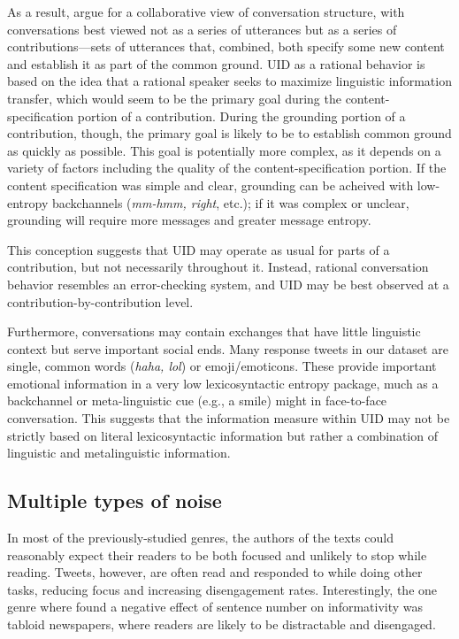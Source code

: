 \documentclass[11pt,letterpaper]{article}
\begin{document}
As a result,  argue for a collaborative view of conversation structure, with conversations best viewed not as a series of utterances but as a series of contributions---sets of utterances that, combined, both specify some new content and establish it as part of the common ground.  UID as a rational behavior is based on the idea that a rational speaker seeks to maximize linguistic  information transfer, which would seem to be the primary goal during the content-specification portion of a contribution.  During the grounding portion of a contribution, though, the primary goal is likely to be to establish common ground as quickly as possible.  This goal is potentially more complex, as it depends on a variety of factors including the quality of the content-specification portion.  If the content specification was simple and clear, grounding can be acheived with low-entropy backchannels ({\it mm-hmm, right}, etc.); if it was complex or unclear, grounding will require more messages and greater message entropy.

This conception suggests that UID may operate as usual for parts of a contribution, but not necessarily throughout it.  Instead, rational conversation behavior resembles an error-checking system, and UID may be best observed at a contribution-by-contribution level.

Furthermore, conversations may contain exchanges that have little linguistic context but serve important social ends.  Many response tweets in our dataset are single, common words ({\it haha, lol}) or emoji/emoticons.  These provide important emotional information in a very low lexicosyntactic entropy package, much as a backchannel or meta-linguistic cue (e.g., a smile) might in face-to-face conversation.  This suggests that the information measure within UID may not be strictly based on literal lexicosyntactic information but rather a combination of linguistic and metalinguistic information.

\subsection{Multiple types of noise}

In most of the previously-studied genres, the authors of the texts could reasonably expect their readers to be both focused and unlikely to stop while reading. Tweets, however, are often read and responded to while doing other tasks, reducing focus and increasing disengagement rates.  Interestingly, the one genre where  found a negative effect of sentence number on informativity was tabloid newspapers, where readers are likely to be distractable and disengaged.
\end{document}
